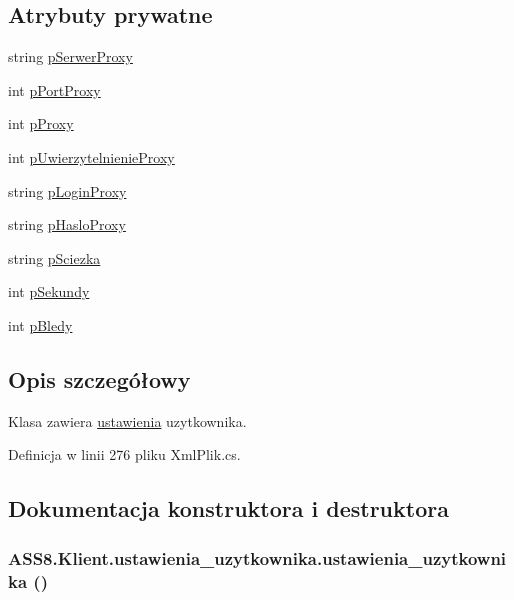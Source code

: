\subsection*{Atrybuty prywatne}
\begin{CompactItemize}
\item 
string \hyperlink{a00029_83c280f3311a98442266bf26e2902e33}{pSerwerProxy}
\item 
int \hyperlink{a00029_ea7cddad01acb9496b5d70208e554601}{pPortProxy}
\item 
int \hyperlink{a00029_b732a4d71609e6fb5630162ab4943d76}{pProxy}
\item 
int \hyperlink{a00029_1d1cb62c1399bfdeed6455ce6b76617f}{pUwierzytelnienieProxy}
\item 
string \hyperlink{a00029_bb0c3aaffad5da7325e4f5c0f243576a}{pLoginProxy}
\item 
string \hyperlink{a00029_dd4d3aa0c6b2dbba8b60dcb868443bf2}{pHasloProxy}
\item 
string \hyperlink{a00029_2f84ead25ee33a7f63f190a9ec6172ec}{pSciezka}
\item 
int \hyperlink{a00029_413c2c068d9d0a29305871fbd3c06ab3}{pSekundy}
\item 
int \hyperlink{a00029_0cfa9fa0a67f8cd106a548e87783e6c2}{pBledy}
\end{CompactItemize}


\subsection{Opis szczegółowy}
Klasa zawiera \hyperlink{a00028}{ustawienia} uzytkownika. 



Definicja w linii 276 pliku XmlPlik.cs.

\subsection{Dokumentacja konstruktora i destruktora}
\hypertarget{a00029_03466d9eb12e9b7aa0399f437bc1b799}{
\subsubsection[{ustawienia\_\-uzytkownika}]{\setlength{\rightskip}{0pt plus 5cm}ASS8.Klient.ustawienia\_\-uzytkownika.ustawienia\_\-uzytkownika ()}}
\label{d5/d16/a00029_03466d9eb12e9b7aa0399f437bc1b799}




